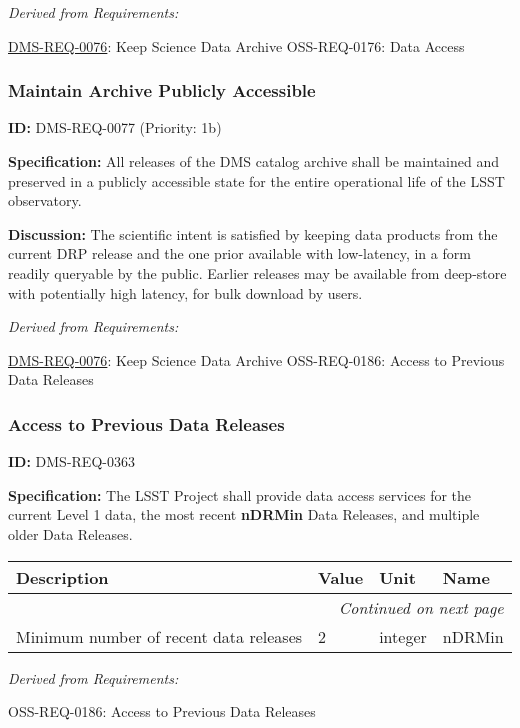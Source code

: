 \documentclass[SE,toc,lsstdraft]{lsstdoc}
\makeatletter
\newcommand{\paramname}[1]{\hspace{0pt}#1}
\newcommand{\unitname}[1]{\hspace{0pt}#1}
\newenvironment{parameters}[0]{%
\setlength\LTleft{0pt}
\setlength\LTright{\fill}
\begin{small}
\begin{longtable}[]{|p{0.49\textwidth}|l|p{0.6in}|p{1.70in}@{}|}

\hline \textbf{Description} & \textbf{Value} & \textbf{Unit} & \textbf{Name} \\ \hline
\endhead

\hline \multicolumn{4}{r}{\emph{Continued on next page}} \\
\endfoot

\hline\hline
\endlastfoot
}{%
\hline
\end{longtable}
\end{small}
}
\makeatother
\begin{document}
\emph{Derived from Requirements:}

\hyperref[DMS-REQ-0076]{DMS-REQ-0076}:
Keep Science Data Archive \newline
OSS-REQ-0176:
Data Access \newline

\subsubsection{Maintain Archive Publicly Accessible}

\label{DMS-REQ-0077}
\textbf{ID:} DMS-REQ-0077 (Priority: 1b)

\textbf{Specification: }All releases of the DMS catalog archive shall be maintained and preserved in a publicly accessible state for the entire operational life of the LSST observatory.

\textbf{Discussion:} The scientific intent is satisfied by keeping data products from the current DRP release and the one prior available with low-latency, in a form readily queryable by the public. Earlier releases may be available from deep-store with potentially high latency, for bulk download by users.

\emph{Derived from Requirements:}

\hyperref[DMS-REQ-0076]{DMS-REQ-0076}:
Keep Science Data Archive \newline
OSS-REQ-0186:
Access to Previous Data Releases \newline

\subsubsection{Access to Previous Data Releases}

\label{DMS-REQ-0363}
\textbf{ID:} DMS-REQ-0363

\textbf{Specification:}
The LSST Project shall provide data access services for the current Level 1 data, the most recent \textbf{nDRMin} Data Releases, and multiple older Data Releases.

\begin{parameters}
Minimum number of recent data releases
&
2
&
\unitname{%
integer
}
&
\paramname{%
nDRMin
} \\\hline
\end{parameters}

\emph{Derived from Requirements:}

OSS-REQ-0186:
Access to Previous Data Releases \newline
\end{document}
